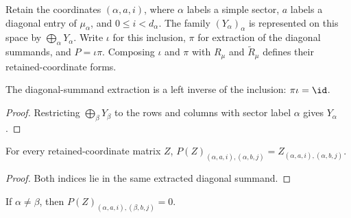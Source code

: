 \begin{definition}
    \label{def:mpdo_retained_vertical_sector_coordinates}
    \leanok
    Retain the coordinates $(\alpha,a,i)$, where $\alpha$ labels a simple
    sector, $a$ labels a diagonal entry of $\mu_\alpha$, and
    $0\leq i<d_\alpha$. The family $(Y_\alpha)_\alpha$ is represented on
    this space by $\bigoplus_\alpha Y_\alpha$.
    Write $\iota$ for this inclusion, $\pi$ for extraction of the diagonal
    summands, and $P=\iota\pi$. Composing $\iota$ and $\pi$ with $R_\mu$ and
    $\widetilde R_\mu$ defines their retained-coordinate forms.
\end{definition}

\begin{lemma}
    \label{lem:mpdo_retained_vertical_sector_extraction}
    \leanok
    The diagonal-summand extraction is a left inverse of the inclusion:
    $\pi\iota=\id$.
\end{lemma}

\begin{proof}\leanok
    Restricting $\bigoplus_\beta Y_\beta$ to the rows and columns with sector
    label $\alpha$ gives $Y_\alpha$.
\end{proof}

\begin{lemma}
    \label{lem:mpdo_retained_vertical_sector_projection_same}
    \leanok
    For every retained-coordinate matrix $Z$,
    $P(Z)_{(\alpha,a,i),(\alpha,b,j)}
        =Z_{(\alpha,a,i),(\alpha,b,j)}$.
\end{lemma}

\begin{proof}\leanok
    Both indices lie in the same extracted diagonal summand.
\end{proof}

\begin{lemma}
    \label{lem:mpdo_retained_vertical_sector_projection_distinct}
    \leanok
    If $\alpha\neq\beta$, then
    $P(Z)_{(\alpha,a,i),(\beta,b,j)}=0$.
\end{lemma}

